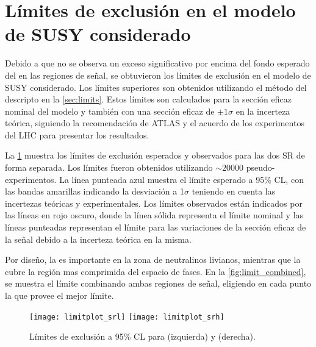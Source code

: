 
\section{Límites de exclusión en el modelo de SUSY considerado}

Debido a que no se observa un exceso significativo por encima del fondo esperado
del {\SM} en las regiones de señal, se obtuvieron los límites de exclusión en el
modelo de SUSY considerado. Los límites superiores son obtenidos utilizando el
método del {\cls} descripto en la \cref{sec:limits}. Estos límites son
calculados para la sección eficaz nominal del modelo y también con una sección
eficaz de $\pm 1 \sigma$ en la incerteza teórica, siguiendo la recomendación de
ATLAS y el acuerdo de los experimentos del LHC para presentar los resultados.

La \cref{fig:limit_srs} muestra los límites de exclusión esperados y
observados para las dos SR de forma separada. Los límites fueron obtenidos
utilizando $\sim 20000$ pseudo-experimentos. La línea punteada azul muestra el
límite esperado a 95\% CL, con las bandas amarillas indicando la desviación a
1$\sigma$ teniendo en cuenta las incertezas teóricas y experimentales. Los
límites observados están indicados por las líneas en rojo oscuro, donde la línea
sólida representa el límite nominal y las líneas punteadas representan el límite
para las variaciones de la sección eficaz de la señal debido a la incerteza
teórica en la misma.

Por diseño, la {\SRL} es importante en la zona de neutralinos livianos, mientras que
la {\SRH} cubre la región mas comprimida del espacio de fases. En la
\cref{fig:limit_combined}, se muestra el límite combinando ambas
regiones de señal, eligiendo en cada punto la que provee el mejor límite.


\begin{figure}[!htbp]
  \centering

  \texttt{[image: limitplot\_srl]}
  \texttt{[image: limitplot\_srh]}

  \caption{Límites de exclusión a 95\% CL para {\SRL}  (izquierda) y {\SRH} (derecha).}
  \label{fig:limit_srs}
\end{figure}


